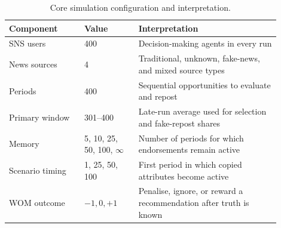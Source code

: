 \begin{table}[tbp]
\centering
\caption{Core simulation configuration and interpretation.}
\label{tab:configuration}
\begin{tabular}{p{0.25\linewidth}p{0.18\linewidth}p{0.47\linewidth}}
\toprule
Component & Value & Interpretation \\
\midrule
SNS users & 400 & Decision-making agents in every run \\
News sources & 4 & Traditional, unknown, fake-news, and mixed source types \\
Periods & 400 & Sequential opportunities to evaluate and repost \\
Primary window & 301--400 & Late-run average used for selection and fake-repost shares \\
Memory & 5, 10, 25, 50, 100, $\infty$ & Number of periods for which endorsements remain active \\
Scenario timing & 1, 25, 50, 100 & First period in which copied attributes become active \\
WOM outcome & $-1,0,+1$ & Penalise, ignore, or reward a recommendation after truth is known \\
\bottomrule
\end{tabular}
\end{table}
